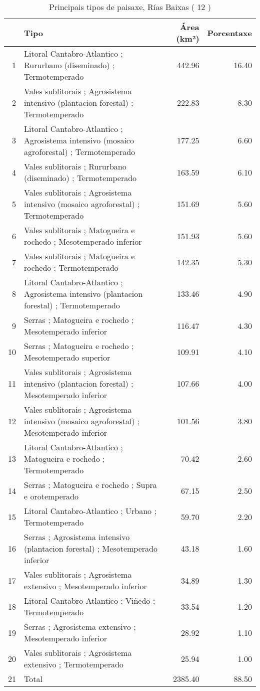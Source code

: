 \begin{table}[p]
\centering
\caption{Principais tipos de paisaxe,  Rías Baixas ( 12 )} 
\label{Tipos 12}
\begin{tabular}{rlrr}
  \hline
 & Tipo & Área (km²) & Porcentaxe \\ 
  \hline
1 & Litoral Cantabro-Atlantico ; Rururbano (diseminado) ; Termotemperado & 442.96 & 16.40 \\ 
  2 & Vales sublitorais ; Agrosistema intensivo (plantacion forestal) ; Termotemperado & 222.83 & 8.30 \\ 
  3 & Litoral Cantabro-Atlantico ; Agrosistema intensivo (mosaico agroforestal) ; Termotemperado & 177.25 & 6.60 \\ 
  4 & Vales sublitorais ; Rururbano (diseminado) ; Termotemperado & 163.59 & 6.10 \\ 
  5 & Vales sublitorais ; Agrosistema intensivo (mosaico agroforestal) ; Termotemperado & 151.69 & 5.60 \\ 
  6 & Vales sublitorais ; Matogueira e rochedo ; Mesotemperado inferior & 151.93 & 5.60 \\ 
  7 & Vales sublitorais ; Matogueira e rochedo ; Termotemperado & 142.35 & 5.30 \\ 
  8 & Litoral Cantabro-Atlantico ; Agrosistema intensivo (plantacion forestal) ; Termotemperado & 133.46 & 4.90 \\ 
  9 & Serras ; Matogueira e rochedo ; Mesotemperado inferior & 116.47 & 4.30 \\ 
  10 & Serras ; Matogueira e rochedo ; Mesotemperado superior & 109.91 & 4.10 \\ 
  11 & Vales sublitorais ; Agrosistema intensivo (plantacion forestal) ; Mesotemperado inferior & 107.66 & 4.00 \\ 
  12 & Vales sublitorais ; Agrosistema intensivo (mosaico agroforestal) ; Mesotemperado inferior & 101.56 & 3.80 \\ 
  13 & Litoral Cantabro-Atlantico ; Matogueira e rochedo ; Termotemperado & 70.42 & 2.60 \\ 
  14 & Serras ; Matogueira e rochedo ; Supra e orotemperado & 67.15 & 2.50 \\ 
  15 & Litoral Cantabro-Atlantico ; Urbano ; Termotemperado & 59.70 & 2.20 \\ 
  16 & Serras ; Agrosistema intensivo (plantacion forestal) ; Mesotemperado inferior & 43.18 & 1.60 \\ 
  17 & Vales sublitorais ; Agrosistema extensivo ; Mesotemperado inferior & 34.89 & 1.30 \\ 
  18 & Litoral Cantabro-Atlantico ; Viñedo ; Termotemperado & 33.54 & 1.20 \\ 
  19 & Serras ; Agrosistema extensivo ; Mesotemperado inferior & 28.92 & 1.10 \\ 
  20 & Vales sublitorais ; Agrosistema extensivo ; Termotemperado & 25.94 & 1.00 \\ 
  21 & Total & 2385.40 & 88.50 \\ 
   \hline
\end{tabular}
\end{table}
